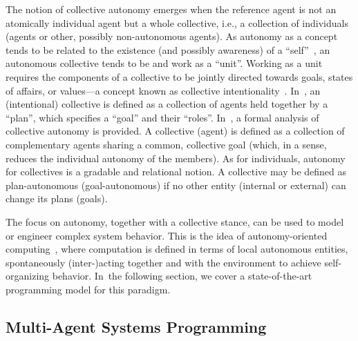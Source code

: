 \documentclass[jsan,article,accept,moreauthors,pdftex]{Definitions/mdpi}
\begin{document}
The notion of {collective autonomy}
 emerges when the reference agent 
 is not an atomically individual agent
 but a whole collective, i.e., a collection of individuals (agents or other, possibly non-autonomous agents).
%
As autonomy as a concept tends to be related to the existence (and possibly awareness) of a ``self''~\cite{sekiyama1996dissipative-structure-network-for-collective-autonomy}, 
 an autonomous collective tends to be and work as a ``unit''.
%
Working as a unit requires the components of a collective
 to be {jointly} directed towards goals, states of affairs, or values---a concept known as {collective intentionality}~\cite{DBLP:journals/cogsr/BottazziCGL06,ray2009collective-intentionality-fleets}. 
%
In~\cite{DBLP:journals/cogsr/BottazziCGL06},
 an (intentional) collective
 is defined as a collection of agents held together by a ``plan'', which specifies a ``goal'' and their ``roles''.
%
In~\cite{conte2006collective-autonomy}, a formal analysis of collective autonomy is provided. A collective (agent) is defined as a collection of complementary agents sharing a common, collective goal (which, in a sense, reduces the individual autonomy of the members).
%
As for individuals, autonomy for collectives is a gradable and relational notion.
%
A collective may be defined as plan-autonomous (goal-autonomous) if no other entity (internal or external) can change its plans (goals).
%

The focus on autonomy, together with a collective stance,
 can be used to model or engineer complex system behavior.
%
This is the idea of {autonomy-oriented computing}~\cite{liu2005autonomy-oriented-computing},
 where computation is defined in terms
 of local autonomous entities, spontaneously (inter-)acting together and with the environment to achieve self-organizing behavior.
%
\mbox{In the} following section, we cover a state-of-the-art programming model for this paradigm.

\subsection{Multi-Agent Systems Programming}
\end{document}
